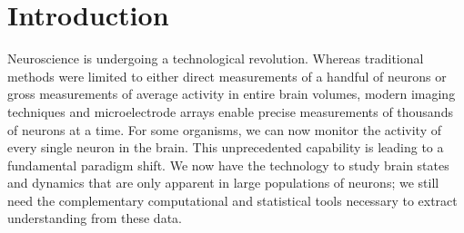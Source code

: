 \chapter{Introduction}
\label{introduction}


Neuroscience is undergoing a technological revolution. Whereas
traditional methods were limited to either direct measurements of a
handful of neurons or gross measurements of average activity in entire
brain volumes, modern imaging techniques and microelectrode arrays
enable precise measurements of thousands of neurons at a time. For
some organisms, we can now monitor the activity of every single neuron
in the brain.  This unprecedented capability is leading to a
fundamental paradigm shift.  We now have the technology to study brain
states and dynamics that are only apparent in large populations of
neurons; we still need the complementary computational and
statistical tools necessary to extract understanding from these data.
 

